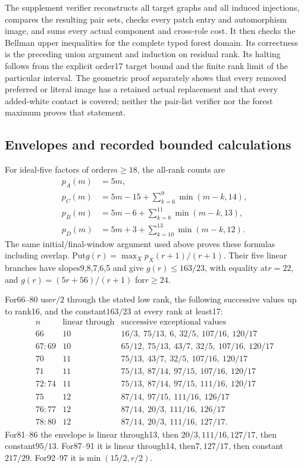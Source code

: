 \documentclass[11pt]{article}
\theoremstyle{remark}\newtheorem{remark}[theorem]{Remark}
\begin{document}
The supplement verifier reconstructs all target graphs and all induced
injections, compares the resulting pair sets, checks every patch
entry and automorphism image, and sums every actual component and
cross-role cost. It then checks the Bellman upper inequalities for
the complete typed forest domain. Its correctness is the preceding
union argument and induction on residual rank. Its halting follows
from the explicit order17 target bound and the finite rank limit
of the particular interval. The geometric proof separately shows
that every removed preferred or literal image has a retained actual
replacement and that every added-white contact is covered; neither
the pair-list verifier nor the forest maximum proves that statement.

\subsection{Envelopes and recorded bounded calculations}

For ideal-five factors of order$m\ge18$, the all-rank counts are
\[
\begin{split}
p_A(m)&=5m,\\
p_C(m)&=5m-15+\sum_{k=6}^{9}\min(m-k,14),\\
p_B(m)&=5m-6+\sum_{k=8}^{11}\min(m-k,13),\\
p_D(m)&=5m+3+\sum_{k=10}^{13}\min(m-k,12).
\end{split}
\]
The same initial/final-window argument used above proves these
formulas including overlap. Put$g(r)=\max_Xp_X(r+1)/(r+1)$.
Their five linear branches have slopes9,8,7,6,5 and give
$g(r)\le163/23$, with equality at$r=22$, and
$g(r)=(5r+56)/(r+1)$ for$r\ge24$.

For66--80 use$r/2$ through the stated low rank, the following
successive values up to rank16, and the constant$163/23$ at
every rank at least17:
\[
\begin{array}{c|c|l}
n&\text{linear through}&\text{successive exceptional values}\\\hline
66&10&16/3,\ 75/13,\ 6,\ 32/5,\ 107/16,\ 120/17\\
67\!:\!69&10&65/12,\ 75/13,\ 43/7,\ 32/5,\ 107/16,\ 120/17\\
70&11&75/13,\ 43/7,\ 32/5,\ 107/16,\ 120/17\\
71&11&75/13,\ 87/14,\ 97/15,\ 107/16,\ 120/17\\
72\!:\!74&11&75/13,\ 87/14,\ 97/15,\ 111/16,\ 120/17\\
75&12&87/14,\ 97/15,\ 111/16,\ 126/17\\
76\!:\!77&12&87/14,\ 20/3,\ 111/16,\ 126/17\\
78\!:\!80&12&87/14,\ 20/3,\ 111/16,\ 127/17 .
\end{array}
\]
For81--86 the envelope is linear through13, then
$20/3,111/16,127/17$, then constant$95/13$. For87--91 it is
linear through14, then$7,127/17$, then constant$217/29$.
For92--97 it is$\min(15/2,r/2)$.
\end{document}
